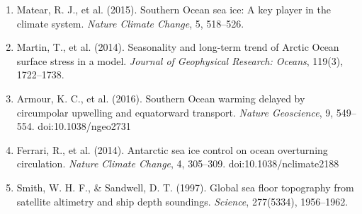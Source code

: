 \documentclass[11pt,a4paper]{article}
\begin{document}
\begin{enumerate}[leftmargin=*,itemsep=2pt,topsep=0pt]
\item Matear, R. J., et al. (2015). Southern Ocean sea ice: A key player in the climate system. \textit{Nature Climate Change}, 5, 518--526.

\item Martin, T., et al. (2014). Seasonality and long-term trend of Arctic Ocean surface stress in a model. \textit{Journal of Geophysical Research: Oceans}, 119(3), 1722--1738.

\item Armour, K. C., et al. (2016). Southern Ocean warming delayed by circumpolar upwelling and equatorward transport. \textit{Nature Geoscience}, 9, 549--554. doi:10.1038/ngeo2731

\item Ferrari, R., et al. (2014). Antarctic sea ice control on ocean overturning circulation. \textit{Nature Climate Change}, 4, 305--309. doi:10.1038/nclimate2188

\item Smith, W. H. F., \& Sandwell, D. T. (1997). Global sea floor topography from satellite altimetry and ship depth soundings. \textit{Science}, 277(5334), 1956--1962.

\end{enumerate}
\end{document}
